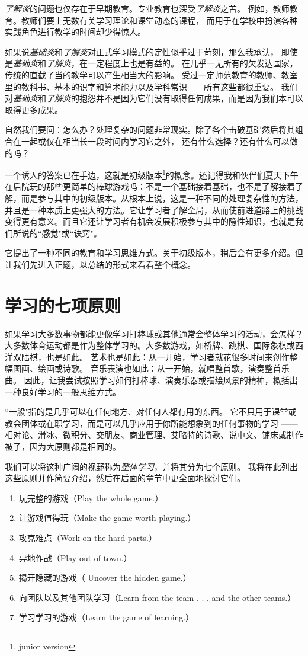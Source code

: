 \textit{了解炎}的问题也仅存在于早期教育。专业教育也深受\textit{了解炎}之苦。
例如，教师教育。教师们要上无数有关学习理论和课堂动态的课程，
而用于在学校中扮演各种实践角色进行教学的时间却少得惊人。

如果说\textit{基础炎}和\textit{了解炎}对正式学习模式的定性似乎过于苛刻，那么我承认，
即使是\textit{基础炎}和\textit{了解炎}，在一定程度上也是有益的。
在几乎一无所有的欠发达国家，传统的直截了当的教学可以产生相当大的影响。
受过一定师范教育的教师、教室里的教科书、基本的识字和算术能力以及学科常识——所有这些都很重要。
我们对\textit{基础炎}和\textit{了解炎}的抱怨并不是因为它们没有取得任何成果，而是因为我们本可以取得更多成果。

自然我们要问：怎么办？处理复杂的问题非常现实。除了各个击破基础然后将其组合在一起或仅在相当长一段时间内学习它之外，
还有什么选择？还有什么可以做的吗？

一个诱人的答案已在手边，这就是初级版本\footnote{junior version}的概念。还记得我和伙伴们夏天下午在后院玩的那些更简单的棒球游戏吗：不是一个基础接着基础，也不是了解接着了解，而是参与其中的初级版本。从根本上说，这是一种不同的处理复杂性的方法，并且是一种本质上更强大的方法。它让学习者了解全局，从而使前进道路上的挑战变得更有意义。而且它还让学习者有机会发展积极参与其中的隐性知识，也就是我们所说的``感觉"或``诀窍"。

它提出了一种不同的教育和学习思维方式。关于初级版本，稍后会有更多介绍。但让我们先进入正题，以总结的形式来看看整个概念。

\section*{学习的七项原则}

如果学习大多数事物都能更像学习打棒球或其他通常会整体学习的活动，会怎样？
大多数体育运动都是作为整体学习的。大多数游戏，如桥牌、跳棋、国际象棋或西洋双陆棋，也是如此。
艺术也是如此：从一开始，学习者就花很多时间来创作整幅图画、绘画或诗歌。
音乐表演也如此：从一开始，就唱整首歌，演奏整首乐曲。
因此，让我尝试按照学习如何打棒球、演奏乐器或描绘风景的精神，概括出一种良好学习的一般思维方式。

``一般"指的是几乎可以在任何地方、对任何人都有用的东西。
它不只用于课堂或教会团体或在职学习，而是可以几乎应用于你所能想象到的任何事物的学习
——相对论、滑冰、微积分、交朋友、商业管理、艾略特的诗歌、说中文、铺床或制作被子，因为大原则都是相同的。

我们可以将这种广阔的视野称为\textit{整体学习}，并将其分为七个原则。
我将在此列出这些原则并作简要介绍，然后在后面的章节中更全面地探讨它们。
\begin{enumerate}
\item 玩完整的游戏（Play the whole game.）
\item 让游戏值得玩（Make the game worth playing.）
\item 攻克难点（Work on the hard parts.）
\item 异地作战（Play out of town.）
\item 揭开隐藏的游戏（ Uncover the hidden game.）
\item 向团队以及其他团队学习（Learn from the team . . . and the other teams.）
\item 学习学习的游戏（Learn the game of learning.）
\end{enumerate}

